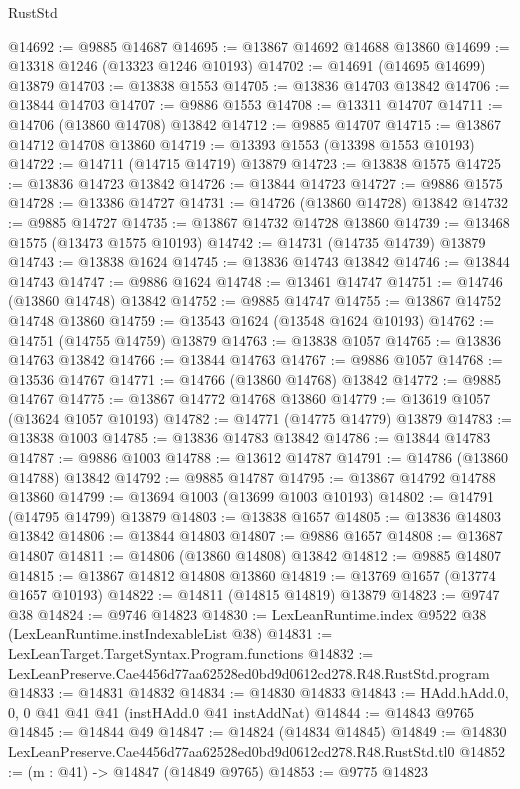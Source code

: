 \begin{lexlean}{RustStd}
\begin{coremodule}
@14692 := @9885 @14687
@14695 := @13867 @14692 @14688 @13860
@14699 := @13318 @1246 (@13323 @1246 @10193)
@14702 := @14691 (@14695 @14699) @13879
@14703 := @13838 @1553
@14705 := @13836 @14703 @13842
@14706 := @13844 @14703
@14707 := @9886 @1553
@14708 := @13311 @14707
@14711 := @14706 (@13860 @14708) @13842
@14712 := @9885 @14707
@14715 := @13867 @14712 @14708 @13860
@14719 := @13393 @1553 (@13398 @1553 @10193)
@14722 := @14711 (@14715 @14719) @13879
@14723 := @13838 @1575
@14725 := @13836 @14723 @13842
@14726 := @13844 @14723
@14727 := @9886 @1575
@14728 := @13386 @14727
@14731 := @14726 (@13860 @14728) @13842
@14732 := @9885 @14727
@14735 := @13867 @14732 @14728 @13860
@14739 := @13468 @1575 (@13473 @1575 @10193)
@14742 := @14731 (@14735 @14739) @13879
@14743 := @13838 @1624
@14745 := @13836 @14743 @13842
@14746 := @13844 @14743
@14747 := @9886 @1624
@14748 := @13461 @14747
@14751 := @14746 (@13860 @14748) @13842
@14752 := @9885 @14747
@14755 := @13867 @14752 @14748 @13860
@14759 := @13543 @1624 (@13548 @1624 @10193)
@14762 := @14751 (@14755 @14759) @13879
@14763 := @13838 @1057
@14765 := @13836 @14763 @13842
@14766 := @13844 @14763
@14767 := @9886 @1057
@14768 := @13536 @14767
@14771 := @14766 (@13860 @14768) @13842
@14772 := @9885 @14767
@14775 := @13867 @14772 @14768 @13860
@14779 := @13619 @1057 (@13624 @1057 @10193)
@14782 := @14771 (@14775 @14779) @13879
@14783 := @13838 @1003
@14785 := @13836 @14783 @13842
@14786 := @13844 @14783
@14787 := @9886 @1003
@14788 := @13612 @14787
@14791 := @14786 (@13860 @14788) @13842
@14792 := @9885 @14787
@14795 := @13867 @14792 @14788 @13860
@14799 := @13694 @1003 (@13699 @1003 @10193)
@14802 := @14791 (@14795 @14799) @13879
@14803 := @13838 @1657
@14805 := @13836 @14803 @13842
@14806 := @13844 @14803
@14807 := @9886 @1657
@14808 := @13687 @14807
@14811 := @14806 (@13860 @14808) @13842
@14812 := @9885 @14807
@14815 := @13867 @14812 @14808 @13860
@14819 := @13769 @1657 (@13774 @1657 @10193)
@14822 := @14811 (@14815 @14819) @13879
@14823 := @9747 @38
@14824 := @9746 @14823
@14830 := LexLeanRuntime.index @9522 @38 (LexLeanRuntime.instIndexableList @38)
@14831 := LexLeanTarget.TargetSyntax.Program.functions
@14832 := LexLeanPreserve.Cae4456d77aa62528ed0bd9d0612cd278.R48.RustStd.program
@14833 := @14831 @14832
@14834 := @14830 @14833
@14843 := HAdd.hAdd.{0, 0, 0} @41 @41 @41 (instHAdd.{0} @41 instAddNat)
@14844 := @14843 @9765
@14845 := @14844 @49
@14847 := @14824 (@14834 @14845)
@14849 := @14830 LexLeanPreserve.Cae4456d77aa62528ed0bd9d0612cd278.R48.RustStd.tl0
@14852 := (m : @41) -> @14847 (@14849 @9765)
@14853 := @9775 @14823

\end{coremodule}
\end{lexlean}
